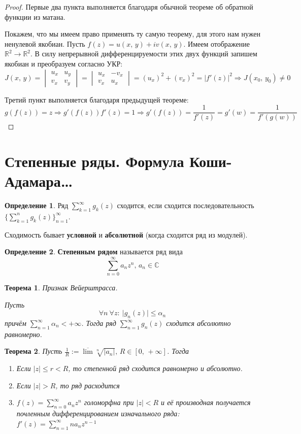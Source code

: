 \documentclass[a4paper,12pt]{article}
\renewcommand{\leq}{\ensuremath{\leqslant}}
\theoremstyle{plain}
\newtheorem{theorem}{Теорема}[section]
\theoremstyle{definition}
\newtheorem{definition}{Определение}[section]
\theoremstyle{remark}
\begin{document}
\begin{proof}
	Первые два пункта выполняется благодаря обычной теореме об обратной функции из матана.

	Покажем, что мы имеем право применять ту самую теорему, для этого нам нужен ненулевой якобиан. Пусть $f(z) = u(x,\,y) + iv(x,\,y)$. Имеем отображение $\mathbb{R}^2 \to \mathbb{R}^2$. В силу непрерывной дифференцируемости этих двух функций запишем якобиан и преобразуем согласно УКР:
	\[
		J(x,\,y) = \begin{vmatrix}
			u_x & u_y \\
			v_x & v_y
		\end{vmatrix} = \begin{vmatrix}
			u_x & -v_x \\
			v_x & u_x
		\end{vmatrix} = (u_x)^2 + (v_x)^2 = \vert f'(z)\vert^2 \Rightarrow J(x_0,\, y_0) \neq 0
	\]

	Третий пункт выполняется благодаря предыдущей теореме:
	\[
		g(f(z)) = z \Rightarrow g'(f(z))f'(z) = 1 \Rightarrow g'(f(z)) = \frac{1}{f'(z)} = g'(w) = \frac{1}{f'(g(w))}
	\]
\end{proof}

\section{Степенные ряды. Формула Коши-Адамара\dots}
\begin{definition}
	Ряд $\sum_{k = 1}^\infty g_k(z)$ сходится, если сходится последовательность $\{\sum_{k=1}^n g_k(z)\}_{n = 1}^\infty$.

	Сходимость бывает \textbf{условной} и \textbf{абсолютной} (когда сходится ряд из модулей).
\end{definition}

\begin{definition}
	\textbf{Степенным рядом} называется ряд вида
	\[
		\sum_{n = 0}^\infty a_nz^n,\, a_n \in \mathbb{C}
	\]
\end{definition}

\begin{theorem}
	Признак Вейерштрасса.

	Пусть
	\[
		\forall n \: \forall z:\: \vert g_n(z)\vert \leq \alpha_n
	\]
	причём $\sum_{n = 1}^\infty \alpha_n < +\infty$. Тогда ряд $\sum_{n = 1}^\infty g_n(z)$ сходится абсолютно равномерно.
\end{theorem}

\begin{theorem}
	Пусть $\frac{1}{R} := \overline{\lim}\sqrt[n]{\vert a_n\vert},\, R \in [0,\, +\infty]$. Тогда
	\begin{enumerate}
		\item Если $\vert z\vert \leq r < R$, то степенной ряд сходится равномерно и абсолютно.
		\item Если $\vert z\vert > R$, то ряд расходится
		\item $f(z) = \sum_{n = 0}^\infty a_nz^n$ голоморфна при $\vert z\vert < R$ и её производная получается почленным дифференцированием изначального ряда: $f'(z) = \sum_{n = 1}^\infty na_nz^{n-1}$
	\end{enumerate}
\end{theorem}
\end{document}
